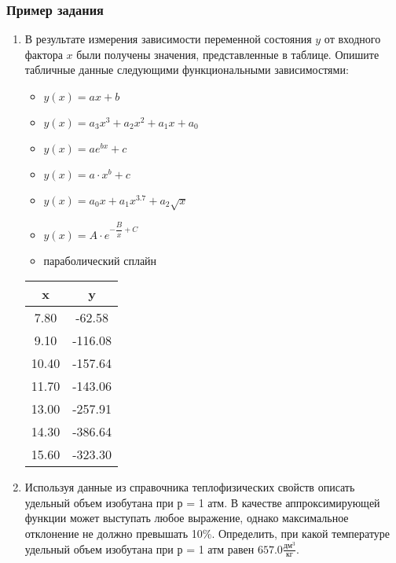 \subsubsection*{Пример задания}
\begin{enumerate}
\item В результате измерения зависимости переменной состояния $y$ от входного фактора $x$ были получены значения, представленные в таблице. Опишите табличные данные следующими функциональными зависимостями:
\begin{itemize} 
	\item $y(x)=a x+b$
	\item $y(x)=a_3 x^3 +a_2 x^2 + a_1 x +a_0$
	\item $y(x)=a e^{b x}+c  $
	\item $y(x)=a \cdot x^b+c$
	\item $y(x)=a_0 x                     +a_1 x^{3.7}                +a_2 \sqrt{x}              $
	\item $y(x)=A \cdot e^{-\dfrac{B}{x}+C}        $
	\item параболический сплайн
\end{itemize}

\begin{table}[h]
	\centering
	\begin{tabular}{|c|c|}
		\hline
		x & y \\ \hline
		7.80 &     -62.58 \\ \hline 
		9.10 &    -116.08 \\ \hline 
		10.40 &    -157.64 \\ \hline 
		11.70 &    -143.06 \\ \hline 
		13.00 &    -257.91 \\ \hline 
		14.30 &    -386.64 \\ \hline 
		15.60 &    -323.30 \\ \hline 
	\end{tabular}
\end{table}


\item  Используя данные из справочника теплофизических свойств \cite{vargaftik} описать удельный объем изобутана при р = 1 атм. В качестве аппроксимирующей функции может выступать любое выражение, однако максимальное отклонение не должно превышать 10\%. Определить, при какой температуре удельный объем изобутана при р = 1 атм равен $   657.0 \frac {\text{дм}^3}{\text{кг}}$.
\end{enumerate}
